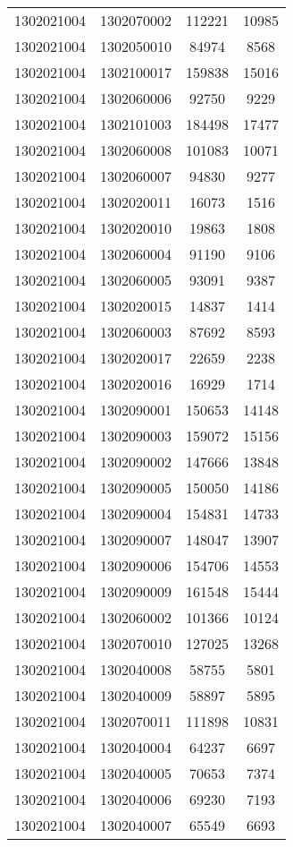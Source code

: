 \begin{longtable}{llcc}
1302021004 & 1302070002 & 112221 & 10985\\
1302021004 & 1302050010 & 84974 & 8568\\
1302021004 & 1302100017 & 159838 & 15016\\
1302021004 & 1302060006 & 92750 & 9229\\
1302021004 & 1302101003 & 184498 & 17477\\
1302021004 & 1302060008 & 101083 & 10071\\
1302021004 & 1302060007 & 94830 & 9277\\
1302021004 & 1302020011 & 16073 & 1516\\
1302021004 & 1302020010 & 19863 & 1808\\
1302021004 & 1302060004 & 91190 & 9106\\
1302021004 & 1302060005 & 93091 & 9387\\
1302021004 & 1302020015 & 14837 & 1414\\
1302021004 & 1302060003 & 87692 & 8593\\
1302021004 & 1302020017 & 22659 & 2238\\
1302021004 & 1302020016 & 16929 & 1714\\
1302021004 & 1302090001 & 150653 & 14148\\
1302021004 & 1302090003 & 159072 & 15156\\
1302021004 & 1302090002 & 147666 & 13848\\
1302021004 & 1302090005 & 150050 & 14186\\
1302021004 & 1302090004 & 154831 & 14733\\
1302021004 & 1302090007 & 148047 & 13907\\
1302021004 & 1302090006 & 154706 & 14553\\
1302021004 & 1302090009 & 161548 & 15444\\
1302021004 & 1302060002 & 101366 & 10124\\
1302021004 & 1302070010 & 127025 & 13268\\
1302021004 & 1302040008 & 58755 & 5801\\
1302021004 & 1302040009 & 58897 & 5895\\
1302021004 & 1302070011 & 111898 & 10831\\
1302021004 & 1302040004 & 64237 & 6697\\
1302021004 & 1302040005 & 70653 & 7374\\
1302021004 & 1302040006 & 69230 & 7193\\
1302021004 & 1302040007 & 65549 & 6693\\

\end{longtable}
